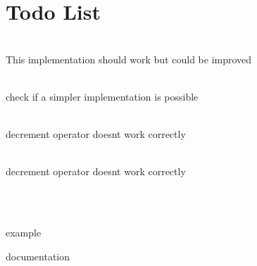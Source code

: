 \chapter{Todo List }
\hypertarget{todo}{}\label{todo}

\begin{DoxyRefList}
\item[{\parbox[t]{\linewidth}{Class \doxylink{classmodm_1_1atomic_1_1_queue}{modm::\+atomic::\+Queue\texorpdfstring{$<$}{<} T, N \texorpdfstring{$>$}{>}} }}]\hfill \\
\label{todo__todo000001}%
%
This implementation should work but could be improved  
\item[{\parbox[t]{\linewidth}{Class \doxylink{classmodm_1_1_bounded_deque_1_1const__iterator}{modm::\+Bounded\+Deque\texorpdfstring{$<$}{<} T, N \texorpdfstring{$>$}{>}::\+const\+\_\+iterator} }}]\hfill \\
\label{todo__todo000002}%
%
check if a simpler implementation is possible  
\item[{\parbox[t]{\linewidth}{Class \doxylink{classmodm_1_1_doubly_linked_list_1_1const__iterator}{modm::\+Doubly\+Linked\+List\texorpdfstring{$<$}{<} T, Allocator \texorpdfstring{$>$}{>}::\+const\+\_\+iterator} }}]\hfill \\
\label{todo__todo000004}%
%
decrement operator doesn\textquotesingle{}t work correctly  
\item[{\parbox[t]{\linewidth}{Class \doxylink{classmodm_1_1_doubly_linked_list_1_1iterator}{modm::\+Doubly\+Linked\+List\texorpdfstring{$<$}{<} T, Allocator \texorpdfstring{$>$}{>}::\+iterator} }}]\hfill \\
\label{todo__todo000003}%
%
decrement operator doesn\textquotesingle{}t work correctly  
\item[{\parbox[t]{\linewidth}{Namespace \doxylink{namespacemodm_1_1filter}{modm::\+filter} }}]\hfill \\
\label{todo__todo000006}%
%
 
\item[{\parbox[t]{\linewidth}{Class \doxylink{classmodm_1_1filter_1_1_ramp}{modm::\+filter::\+Ramp\texorpdfstring{$<$}{<} T \texorpdfstring{$>$}{>}} }}]\hfill \\
\label{todo__todo000009}%
%
example

\label{todo__todo000010}%
%
documentation



\end{DoxyRefList}
